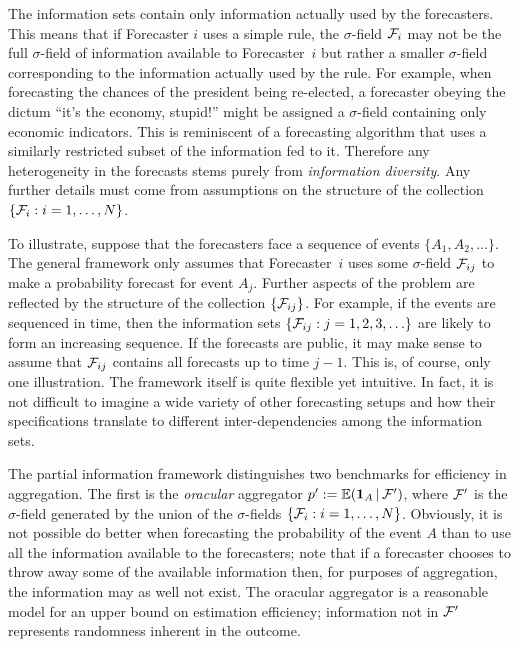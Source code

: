 \documentclass[11pt]{article}
\newcommand{\E}{\mathbb{E}}
\theoremstyle{definition}
\theoremstyle{definition}
\def\one{{\bf 1}}
\def\F{{\cal F}}
\def\E{{\mathbb E}}
\def\|{\, | \,}
\begin{document}
The information sets contain only information actually used by the
forecasters. This means that if Forecaster $i$ uses a simple rule, the
$\sigma$-field $\F_i$ may not be the full $\sigma$-field of
information available to Forecaster~$i$ but rather a smaller
$\sigma$-field corresponding to the information actually used by the
rule.  For example, when forecasting the chances of the president
being re-elected, a forecaster obeying the dictum ``it's the economy,
stupid!''  might be assigned a $\sigma$-field containing only economic
indicators.  This is reminiscent of a forecasting algorithm that uses
a similarly restricted subset of the information fed to it. Therefore
any heterogeneity in the forecasts stems purely from
\textit{information diversity}.  Any further details must come from
assumptions on the structure of the collection $\{ \F_i : i = 1,
\dots, N\}$.  %

To illustrate, suppose that the forecasters face a sequence of events
$\{ A_1, A_2 , \ldots \}$. The general framework only assumes that
Forecaster~$i$ uses some $\sigma$-field $\F_{ij}$ to make a
probability forecast for event $A_j$.  Further aspects of the problem
are reflected by the structure of the collection $\{ \F_{ij} \}$.  For
example, if the events are sequenced in time, then the information
sets $\{ \F_{ij} : j = 1 , 2, 3, \ldots \}$ are likely to form an
increasing sequence.  If the forecasts are public, it may make sense
to assume that $\F_{ij}$ contains all forecasts up to time $j-1$.
This is, of course, only one illustration. The framework itself is quite flexible
yet intuitive. In fact, it is not difficult to imagine a wide variety
of other forecasting setups and how their specifications translate to
different inter-dependencies among the information sets.


The partial information framework distinguishes two benchmarks for
efficiency in aggregation.  The first is the {\em oracular} aggregator
$p' := \E (\one_A \| \F')$, where $\F'$ is the $\sigma$-field
generated by the union of the $\sigma$-fields $\{ \F_i : i = 1, \dots,
N\}$.  Obviously, it is not possible do better when forecasting the
probability of the event $A$ than to use all the information available
to the forecasters; note that if a forecaster chooses to throw away
some of the available information then, for purposes of aggregation,
the information may as well not exist.  The oracular aggregator is a
reasonable model for an upper bound on estimation efficiency;
information not in $\F'$ represents randomness inherent in the
outcome.
\end{document}
